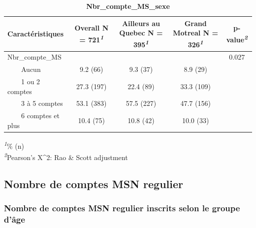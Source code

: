 \documentclass[
]{article}
\begin{document}
\newpage
\begin{table}[!t]
\caption{\label{tab:unnamed-chunk-47}\textbf{Nbr\_compte\_MS\_sexe}} 
\fontsize{12.0pt}{14.4pt}\selectfont
\begin{tabular*}{\linewidth}{@{\extracolsep{\fill}}lcccc}
\toprule
\textbf{Caractéristiques} & \textbf{Overall}  N = 721\textsuperscript{\textit{1}} & \textbf{Ailleurs au Quebec}  N = 395\textsuperscript{\textit{1}} & \textbf{Grand Motreal}  N = 326\textsuperscript{\textit{1}} & \textbf{p-value}\textsuperscript{\textit{2}} \\ 
\midrule\addlinespace[2.5pt]
Nbr\_compte\_MS &  &  &  & 0.027 \\ 
    Aucun & 9.2 (66) & 9.3 (37) & 8.9 (29) &  \\ 
    1 ou 2 comptes & 27.3 (197) & 22.4 (89) & 33.3 (109) &  \\ 
    3 à 5 comptes & 53.1 (383) & 57.5 (227) & 47.7 (156) &  \\ 
    6 comptes et plus & 10.4 (75) & 10.8 (42) & 10.0 (33) &  \\ 
\bottomrule
\end{tabular*}
\begin{minipage}{\linewidth}
\textsuperscript{\textit{1}}\% (n)\\
\textsuperscript{\textit{2}}Pearson's X\^{}2: Rao \& Scott adjustment\\
\end{minipage}
\end{table}

\vspace{1cm}

\hypertarget{nombre-de-comptes-msn-regulier}{%
\subsection{Nombre de comptes MSN
regulier}\label{nombre-de-comptes-msn-regulier}}

\vspace{1cm}

\hypertarget{nombre-de-comptes-msn-regulier-inscrits-selon-le-groupe-duxe2ge}{%
\subsubsection{Nombre de comptes MSN regulier inscrits selon le groupe
d'âge}\label{nombre-de-comptes-msn-regulier-inscrits-selon-le-groupe-duxe2ge}}
\end{document}
